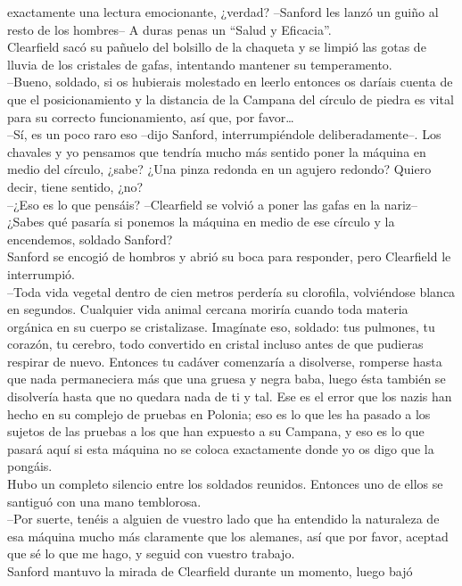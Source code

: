 exactamente una lectura emocionante, ¿verdad? --Sanford les lanzó un
guiño al resto de los hombres-- A duras penas un ``Salud y Eficacia''.\\
Clearfield sacó su pañuelo del bolsillo de la chaqueta y se limpió las
gotas de lluvia de los cristales de gafas, intentando mantener su
temperamento.\\
--Bueno, soldado, si os hubierais molestado en leerlo entonces os
daríais cuenta de que el posicionamiento y la distancia de la Campana
del círculo de piedra es vital para su correcto funcionamiento, así que,
por favor\ldots{}\\
--Sí, es un poco raro eso --dijo Sanford, interrumpiéndole
deliberadamente--. Los chavales y yo pensamos que tendría mucho más
sentido poner la máquina en medio del círculo, ¿sabe? ¿Una pinza redonda
en un agujero redondo? Quiero decir, tiene sentido, ¿no?\\
--¿Eso es lo que pensáis? --Clearfield se volvió a poner las gafas en la
nariz-- ¿Sabes qué pasaría si ponemos la máquina en medio de ese círculo
y la encendemos, soldado Sanford?\\
Sanford se encogió de hombros y abrió su boca para responder, pero
Clearfield le interrumpió.\\
--Toda vida vegetal dentro de cien metros perdería su clorofila,
volviéndose blanca en segundos. Cualquier vida animal cercana moriría
cuando toda materia orgánica en su cuerpo se cristalizase. Imagínate
eso, soldado: tus pulmones, tu corazón, tu cerebro, todo convertido en
cristal incluso antes de que pudieras respirar de nuevo. Entonces tu
cadáver comenzaría a disolverse, romperse hasta que nada permaneciera
más que una gruesa y negra baba, luego ésta también se disolvería hasta
que no quedara nada de ti y tal. Ese es el error que los nazis han hecho
en su complejo de pruebas en Polonia; eso es lo que les ha pasado a los
sujetos de las pruebas a los que han expuesto a su Campana, y eso es lo
que pasará aquí si esta máquina no se coloca exactamente donde yo os
digo que la pongáis.\\
Hubo un completo silencio entre los soldados reunidos. Entonces uno de
ellos se santiguó con una mano temblorosa.\\
--Por suerte, tenéis a alguien de vuestro lado que ha entendido la
naturaleza de esa máquina mucho más claramente que los alemanes, así que
por favor, aceptad que sé lo que me hago, y seguid con vuestro
trabajo.\\
Sanford mantuvo la mirada de Clearfield durante un momento, luego bajó
